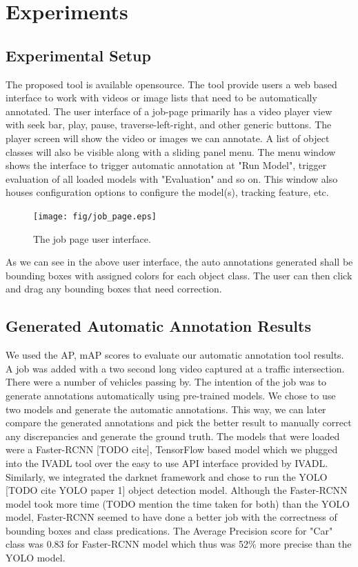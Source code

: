 \documentclass[conference]{IEEEtran}
\begin{document}
\section{Experiments} \label{sec.experiment}
\subsection{Experimental Setup} \label{sec.data}
The proposed tool is available opensource. The tool provide users a web based interface to work with videos or image lists that need to be automatically annotated. 
The user interface of a job-page primarily has a video player view with seek bar, play, pause, traverse-left-right, and other generic buttons. 
The player screen will show the video or images we can annotate. 
A list of object classes will also be visible along with a sliding panel menu. 
The menu window shows the interface to trigger automatic annotation at "Run Model", trigger evaluation of all loaded models with "Evaluation" and so on. 
This window also houses configuration options to configure the model(s), tracking feature, etc.
\begin{figure}[!htb]
\centering
\texttt{[image: fig/job\_page.eps]}
\caption{The job page user interface.} \label{fig.structure}
\end{figure}
As we can see in the above user interface, the auto annotations generated shall be bounding boxes with assigned colors for each object class.
The user can then click and drag any bounding boxes that need correction.

\subsection{Generated Automatic Annotation Results} \label{sec.autoannres}
We used the AP, mAP scores to evaluate our automatic annotation tool results. 
A job was added with a two second long video captured at a traffic intersection. 
There were a number of vehicles passing by. 
The intention of the job was to generate annotations automatically using pre-trained models. We chose to use two models and generate the automatic annotations. 
This way, we can later compare the generated annotations and pick the better result to manually correct any discrepancies and generate the ground truth. 
The models that were loaded were a Faster-RCNN [TODO cite], TensorFlow based model which we plugged into the IVADL tool over the easy to use API interface provided by IVADL. 
Similarly, we integrated the darknet framework and chose to run the YOLO [TODO cite YOLO paper 1] object detection model. 
Although the Faster-RCNN model took more time (TODO mention the time taken for both) than the YOLO model, 
Faster-RCNN seemed to have done a better job with the correctness of bounding boxes and class predications.
The Average Precision score for "Car" class was {0.83} for Faster-RCNN model which thus was {52\%} more precise than the YOLO model.
\end{document}
